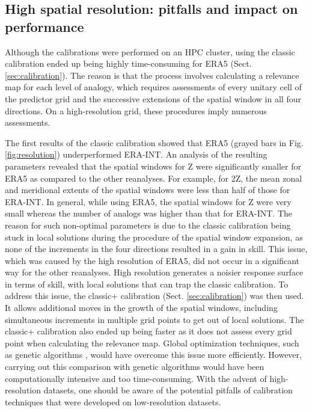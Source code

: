 \documentclass[alpha-refs]{wiley-article}
\begin{document}
\subsection{High spatial resolution: pitfalls and impact on performance}
\label{sec:results_hires}

Although the calibrations were performed on an HPC cluster, using the classic calibration ended up being highly time-consuming for ERA5 (Sect. \ref{sec:calibration}). The reason is that the process involves calculating a relevance map for each level of analogy, which requires assessments of every unitary cell of the predictor grid and the successive extensions of the spatial window in all four directions. On a high-resolution grid, these procedures imply numerous assessments.

The first results of the classic calibration showed that ERA5 (grayed bars in Fig. \ref{fig:resolution}) underperformed ERA-INT. An analysis of the resulting parameters revealed that the spatial windows for Z were significantly smaller for ERA5 as compared to the other reanalyses. For example, for 2Z, the mean zonal and meridional extents of the spatial windows were less than half of those for ERA-INT. In general, while using ERA5, the spatial windows for Z were very small whereas the number of analogs was higher than that for ERA-INT. The reason for such non-optimal parameters is due to the classic calibration being stuck in local solutions during the procedure of the spatial window expansion, as none of the increments in the four directions resulted in a gain in skill. This issue, which was caused by the high resolution of ERA5, did not occur in a significant way for the other reanalyses. High resolution generates a noisier response surface in terms of skill, with local solutions that can trap the classic calibration. To address this issue, the classic+ calibration (Sect. \ref{sec:calibration}) was then used. It allows additional moves in the growth of the spatial windows, including simultaneous increments in multiple grid points to get out of local solutions. The classic+ calibration also ended up being faster as it does not assess every grid point when calculating the relevance map. Global optimization techniques, such as genetic algorithms \citep{Horton2017a}, would have overcome this issue more efficiently. However, carrying out this comparison with genetic algorithms would have been computationally intensive and too time-consuming. With the advent of high-resolution datasets, one should be aware of the potential pitfalls of calibration techniques that were developed on low-resolution datasets.
\end{document}
